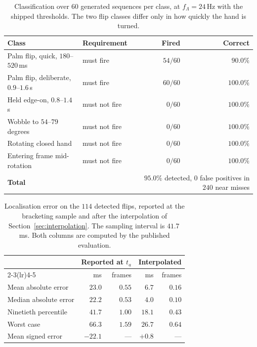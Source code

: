 \documentclass{article}
\theoremstyle{definition}
\begin{document}
\begin{table}[t]
  \centering
  \caption{Classification over $60$ generated sequences per class, at
  $f_\Lambda = 24$\,Hz with the shipped thresholds. The two flip classes differ
  only in how quickly the hand is turned.}
  \label{tab:classification}
  \begin{tabular}{llrr}
    \toprule
    Class & Requirement & Fired & Correct \\
    \midrule
    Palm flip, quick, $180$--$520$\,ms      & must fire     & $54/60$ & $90.0\%$ \\
    Palm flip, deliberate, $0.9$--$1.6$\,s  & must fire     & $60/60$ & $100.0\%$ \\
    Held edge-on, $0.8$--$1.4$\,s           & must not fire & $0/60$  & $100.0\%$ \\
    Wobble to $54$--$79$ degrees            & must not fire & $0/60$  & $100.0\%$ \\
    Rotating closed hand                    & must not fire & $0/60$  & $100.0\%$ \\
    Entering frame mid-rotation             & must not fire & $0/60$  & $100.0\%$ \\
    \midrule
    \textbf{Total}                          &               & \multicolumn{2}{r}{$95.0\%$ detected, $0$ false positives in $240$ near misses} \\
    \bottomrule
  \end{tabular}
\end{table}

\begin{table}[t]
  \centering
  \caption{Localisation error on the $114$ detected flips, reported at the
  bracketing sample and after the interpolation of
  Section~\ref{sec:interpolation}. The sampling interval is $41.7$\,ms. Both
  columns are computed by the published evaluation.}
  \label{tab:localisation}
  \begin{tabular}{lrrrr}
    \toprule
    & \multicolumn{2}{c}{Reported at $t_a$} & \multicolumn{2}{c}{Interpolated} \\
    \cmidrule(lr){2-3}\cmidrule(lr){4-5}
    & ms & frames & ms & frames \\
    \midrule
    Mean absolute error   & $23.0$ & $0.55$ & $6.7$  & $0.16$ \\
    Median absolute error & $22.2$ & $0.53$ & $4.0$  & $0.10$ \\
    Ninetieth percentile  & $41.7$ & $1.00$ & $18.1$ & $0.43$ \\
    Worst case            & $66.3$ & $1.59$ & $26.7$ & $0.64$ \\
    Mean signed error     & $-22.1$ & ---   & $+0.8$ & ---    \\
    \bottomrule
  \end{tabular}
\end{table}
\end{document}
